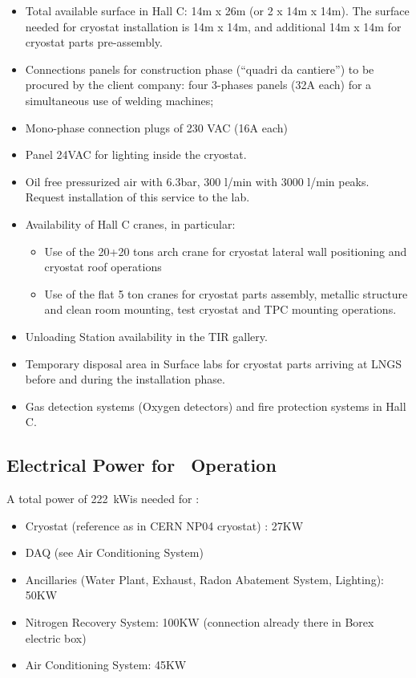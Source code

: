 \begin{itemize}

\item Total available surface in Hall C: 14m x 26m (or 2 x 14m x 14m). The surface needed for cryostat installation is 14m x 14m, and additional 14m x 14m for cryostat parts pre-assembly. 
\item Connections panels for construction phase (“quadri da cantiere”) to be procured by the client company: four 3-phases panels (32A each) for a simultaneous use of welding machines;
\item Mono-phase connection plugs of 230 VAC (16A each)
\item Panel 24VAC for lighting inside the cryostat.
\item Oil free pressurized air with 6.3bar, 300 l/min with 3000 l/min peaks. Request installation of this service to the lab.
\item Availability of Hall C cranes, in particular:
\begin{itemize}[label=-]
\item Use of the 20+20 tons arch crane for cryostat lateral wall positioning and cryostat roof operations
\item Use of the flat 5 ton cranes for cryostat parts assembly, metallic structure and clean room mounting, test cryostat and TPC mounting operations.
\end{itemize}
\item Unloading Station availability in the TIR gallery.
\item Temporary disposal area in Surface labs for cryostat parts arriving at LNGS before and during the installation phase. 
\item Gas detection systems (Oxygen detectors) and fire protection systems in Hall C.
\end{itemize}

\subsection{Electrical Power for \DSks\ Operation}
\label{sec:ElectricalPower}

\newcommand{\TotalPowerConsumption}{\SI{222}{\kW}}
\newcommand{\TotalUPSPowerConsumption}{\SI{85}{\kW}}

A total power of \TotalPowerConsumption is needed for \DSks:

\begin{itemize}
\item Cryostat (reference as in CERN NP04 cryostat) : 27KW 
\item DAQ (see Air Conditioning System) 
\item Ancillaries (Water Plant, Exhaust, Radon Abatement System, Lighting): 50KW 
\item Nitrogen Recovery System: 100KW (connection already there in Borex electric box)
\item Air Conditioning System: 45KW 
\end{itemize}
\vspace{\baselineskip}


